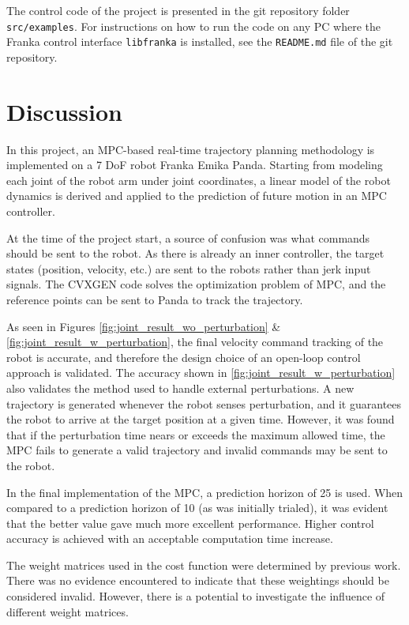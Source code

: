 \documentclass[final]{LTHtwocol} %
\begin{document}
The control code of the project is presented in the git repository folder \texttt{src/examples}.\cite{gitrepo} For instructions on how to run the code on any PC where the Franka control interface \texttt{libfranka} is installed, see the \texttt{README.md} file of the git repository.

\section{Discussion} \label{sec:Conclusion}

In this project, an MPC-based real-time trajectory planning methodology is implemented on a 7 DoF robot Franka Emika Panda. Starting from modeling each joint of the robot arm under joint coordinates, a linear model of the robot dynamics is derived and applied to the prediction of future motion in an MPC controller. 

At the time of the project start, a source of confusion was what commands should be sent to the robot. As there is already an inner controller, the target states (position, velocity, etc.) are sent to the robots rather than jerk input signals. The CVXGEN code solves the optimization problem of MPC, and the reference points can be sent to Panda to track the trajectory.

As seen in Figures \ref{fig:joint_result_wo_perturbation} \& \ref{fig:joint_result_w_perturbation}, the final velocity command tracking of the robot is accurate, and therefore the design choice of an open-loop control approach is validated. 
The accuracy shown in \ref{fig:joint_result_w_perturbation} also validates the method used to handle external perturbations. A new trajectory is generated whenever the robot senses perturbation, and it guarantees the robot to arrive at the target position at a given time. However, it was found that if the perturbation time nears or exceeds the maximum allowed time, the MPC fails to generate a valid trajectory and invalid commands may be sent to the robot.

In the final implementation of the MPC, a prediction horizon of 25 is used. When compared to a prediction horizon of 10 (as was initially trialed), it was evident that the better value gave much more excellent performance. Higher control accuracy is achieved with an acceptable computation time increase. 

The weight matrices used in the cost function were determined by previous work.\cite{MPC2019} There was no evidence encountered to indicate that these weightings should be considered invalid. However, there is a potential to investigate the influence of different weight matrices. 
\end{document}
